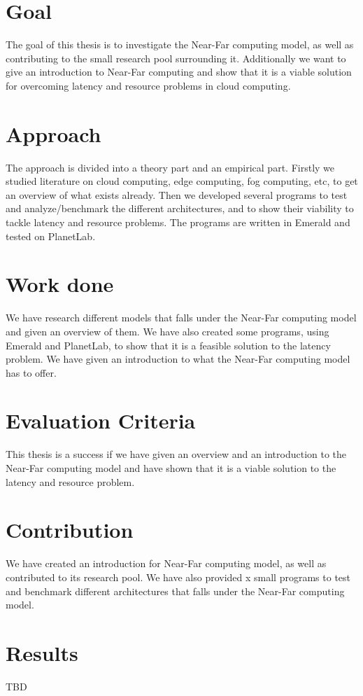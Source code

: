 \section{Goal}
The goal of this thesis is to investigate the Near-Far computing model, as well as contributing to the small research pool surrounding it. Additionally we want to give an introduction to Near-Far computing and show that it is a viable solution for overcoming latency and resource problems in cloud computing.

\section{Approach}
The approach is divided into a theory part and an empirical part. Firstly we studied literature on cloud computing, edge computing, fog computing, etc, to get an overview of what exists already. Then we developed several programs to test and analyze/benchmark the different architectures, and to show their viability to tackle latency and resource problems. The programs are written in Emerald and tested on PlanetLab.


\section{Work done}
We have research different models that falls under the Near-Far computing model and given an overview of them. We have also created some programs, using Emerald and PlanetLab, to show that it is a feasible solution to the latency problem. We have given an introduction to what the Near-Far computing model has to offer.

\section{Evaluation Criteria}
This thesis is a success if we have given an overview and an introduction to the Near-Far computing model and have shown that it is a viable solution to the latency and resource problem.

\section{Contribution}
We have created an introduction for Near-Far computing model, as well as contributed to its research pool. We have also provided x small programs to test and benchmark different architectures that falls under the Near-Far computing model.

\section{Results}
TBD

